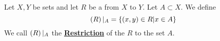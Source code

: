\newcommand{\Restriction}[0]{\textbf{\hyperref[def:FunctionRestriction]{Restriction}}\xspace}
\newcommand{\scRestriction}[2]{\ensuremath{\pa{#1}|_{#2}}\xspace}
\begin{df}[Restriction]
\label{def:FunctionRestriction}

\rm
    Let $X,Y$ be sets and 
    let $R$ be a 
    \Relation from 
    $X$ to $Y$. 
    Let $A \subset X$. 
    We define 
    \begin{equation*}
        \scRestriction{R}{A} = \{(x,y)\in R| x \in A \}
    \end{equation*}
    We call 
    \scRestriction{R}{A}
    the 
    \Restriction 
    of the \Relation
    $R$
    to the set 
    $A$. 
\end{df}
